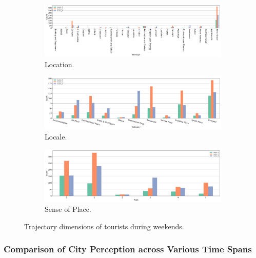 \documentclass{article}
\theoremstyle{definition}
\theoremstyle{remark}
\begin{document}
\begin{figure}[!h]

\centering
\begin{subfigure}{0.6\textheight}
\centering
\includegraphics[width=1\linewidth]{figures/traj_location_weekend_tourists.png}
\caption{Location.}
\label{fig:traj_location_weekend_tourists}
\end{subfigure}
\begin{subfigure}{0.6\textheight}
\centering
\includegraphics[width=1\linewidth]{figures/traj_locale_weekend_tourists.png}
\caption{Locale.}
\label{fig:traj_locale_weekend_tourists}
\end{subfigure}
\begin{subfigure}{0.6\textheight}
\centering
\includegraphics[width=1\linewidth]{figures/traj_sense_weekend_tourists.png}
\caption{Sense of Place.}
\label{fig:traj_sense_weekend_tourists}
\end{subfigure}

\caption{Trajectory dimensions of tourists during weekends.}
\label{fig:traj_dimension_weekend_tourists}
\end{figure}

\subsubsection{Comparison of City Perception across Various Time Spans} \label{comparison_perception}
\end{document}
